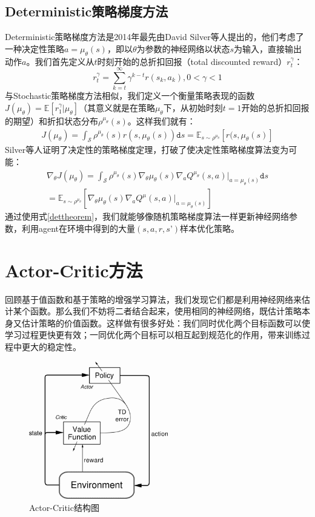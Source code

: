 \subsection{Deterministic策略梯度方法}
Deterministic策略梯度方法\cite{silver2014deter}是2014年最先由David Silver等人提出的，他们考虑了一种决定性策略$a = \mu_\theta(s)$，即以$\theta$为参数的神经网络以状态$s$为输入，直接输出动作$a$。我们首先定义从$t$时刻开始的总折扣回报（total discounted reward）$r^\gamma_t$：
\begin{equation}
r^\gamma_t = \sum^\infty_{k=t}\gamma^{k-t} r(s_k,a_k), 0<\gamma<1
\end{equation}
与Stochastic策略梯度方法相似，我们定义一个衡量策略表现的函数$J(\mu_\theta) = \mathbb{E}[r^\gamma_1 \vert \mu_\theta]$（其意义就是在策略$\mu_\theta$下，从初始时刻$t=1$开始的总折扣回报的期望）和折扣状态分布$\rho^{\mu_\theta}(s)$。这样我们就有：
\begin{equation}
\begin{split}
J(\mu_\theta) = \int_\mathcal{S}\rho^{\mu_\theta}(s) r(s, \mu_\theta(s))\texttt{d}s = \mathbb{E}_{s\sim \rho^{\mu_\theta}}[r(s, \mu_\theta(s)]
\end{split}
\label{detobj}
\end{equation}
Silver等人证明了决定性的策略梯度定理，打破了使决定性策略梯度算法变为可能：
\begin{equation}
\begin{split}
\nabla_\theta J(\mu_\theta) = \int_\mathcal{S}\rho^{\mu_\theta}(s)\nabla_\theta \mu_\theta(s) \nabla_a Q^{\mu_\theta}(s,a) \vert_{a = \mu_\theta(s)} \texttt{d}s \\  = \mathbb{E}_{s\sim \rho^{\mu_\theta}}[\nabla_\theta \mu_\theta(s) \nabla_a Q^\mu(s,a) \vert_{a = \mu_\theta(s)}]
\end{split}
\label{dettheorem}
\end{equation}
通过使用式\ref{dettheorem}，我们就能够像随机策略梯度算法一样更新神经网络参数，利用agent在环境中得到的大量$(s,a,r,s’)$样本优化策略。
\section{Actor-Critic方法}
回顾基于值函数和基于策略的增强学习算法，我们发现它们都是利用神经网络来估计某个函数。那么我们不妨将二者结合起来，使用相同的神经网络，既估计策略本身又估计策略的价值函数。这样做有很多好处：我们同时优化两个目标函数可以使学习过程更快更有效；一同优化两个目标可以相互起到规范化的作用，带来训练过程中更大的稳定性。
\begin{figure}
    \centering
    \includegraphics[height=6cm]{figure/actor-critic.png}
    \caption{Actor-Critic结构图}
    \label{fig:actor-critic}
\end{figure}
